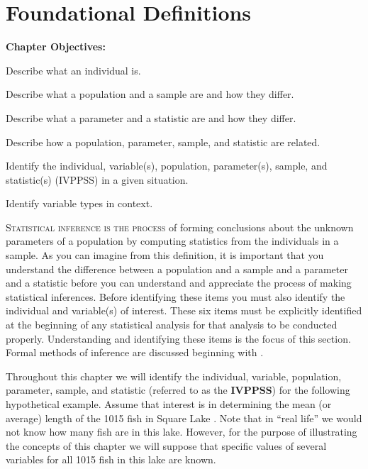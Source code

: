 \documentclass[10pt,openany]{book}\usepackage[]{graphicx}\usepackage[]{color}
\begin{document}
\chapter{Foundational Definitions} \label{chap:FoundationalDefinitions}
\begin{ChapObj}{\boxwidth}
  \textbf{Chapter Objectives:}
  \begin{Enumerate}
    \item Describe what an individual is.
    \item Describe what a population and a sample are and how they differ.
    \item Describe what a parameter and a statistic are and how they differ.
    \item Describe how a population, parameter, sample, and statistic are related.
    \item Identify the individual, variable(s), population, parameter(s), sample, and statistic(s) (IVPPSS) in a given situation.
    \item Identify variable types in context.
  \end{Enumerate}
\end{ChapObj}

\minitoc
\newpage

\lettrine{S}{tatistical inference is the process} of forming conclusions about the unknown parameters of a population by computing statistics from the individuals in a sample.  As you can imagine from this definition, it is important that you understand the difference between a population and a sample and a parameter and a statistic before you can understand and appreciate the process of making statistical inferences.  Before identifying these items you must also identify the individual and variable(s) of interest.  These six items must be explicitly identified at the beginning of any statistical analysis for that analysis to be conducted properly.  Understanding and identifying these items is the focus of this section.  Formal methods of inference are discussed beginning with .


Throughout this chapter we will identify the individual, variable, population, parameter, sample, and statistic (referred to as the \textbf{IVPPSS}) for the following hypothetical example.  Assume that interest is in determining the mean (or average) length of the 1015 fish in Square Lake .  Note that in ``real life'' we would not know how many fish are in this lake.  However, for the purpose of illustrating the concepts of this chapter we will suppose that specific values of several variables for all 1015 fish in this lake are known.
\end{document}
